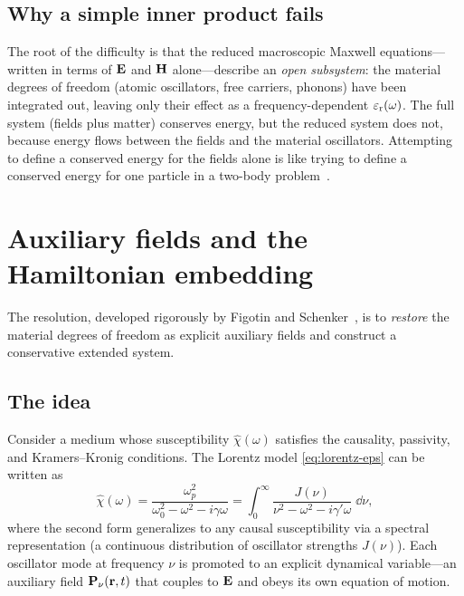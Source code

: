 \subsection{Why a simple inner product fails}
\label{ssec:no-simple-inner}

The root of the difficulty is that the reduced macroscopic Maxwell
equations---written in terms of $\mathbf{E}$ and $\mathbf{H}$ alone---describe an
\emph{open subsystem}: the material degrees of freedom (atomic
oscillators, free carriers, phonons) have been integrated out, leaving
only their effect as a frequency-dependent $\varepsilon_{\mathrm{r}}(\omega)$. The full
system (fields plus matter) conserves energy, but the reduced system does
not, because energy flows between the fields and the material oscillators.
Attempting to define a conserved energy for the fields alone is like
trying to define a conserved energy for one particle in a two-body
problem~\cite{figotin2004hamiltonian}.


\section{Auxiliary fields and the Hamiltonian embedding}
\label{sec:auxiliary-fields}

The resolution, developed rigorously by Figotin and
Schenker~\cite{figotin2004hamiltonian}, is to \emph{restore} the material
degrees of freedom as explicit auxiliary fields and construct a
conservative extended system.

\subsection{The idea}
\label{ssec:aux-idea}

Consider a medium whose susceptibility $\hat{\chi}(\omega)$ satisfies the
causality, passivity, and Kramers--Kronig conditions. The Lorentz model
\eqref{eq:lorentz-eps} can be written as
\begin{equation}
 \hat{\chi}(\omega)
 = \frac{\omega_p^2}{\omega_0^2 - \omega^2 - i\gamma\omega}
 = \int_0^\infty\!\frac{J(\nu)}{\nu^2 - \omega^2 - i\gamma'\omega}\;\dd\nu,
 \label{eq:spectral-representation}
\end{equation}
where the second form generalizes to any causal susceptibility via a
spectral representation (a continuous distribution of oscillator strengths
$J(\nu)$). Each oscillator mode at frequency $\nu$ is promoted to an
explicit dynamical variable---an auxiliary field $\mathbf{P}_\nu(\mathbf{r},t)$
that couples to $\mathbf{E}$ and obeys its own equation of motion.

